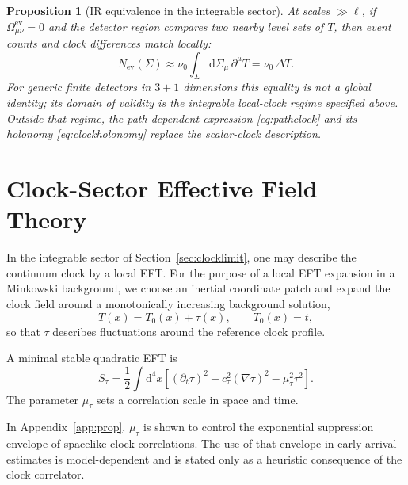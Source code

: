 \documentclass[11pt, a4paper]{article}
\theoremstyle{definition}
\theoremstyle{plain}
\newtheorem{proposition}{Proposition}[section]
\theoremstyle{remark}
\numberwithin{equation}{section}
\newcommand{\dd}{\mathrm{d}}
\newcommand{\Sig}{\Sigma}
\newcommand{\Nev}{N_{\mathrm{ev}}}
\begin{document}
    \begin{proposition}[IR equivalence in the integrable sector]
        At scales $\gg \ell$, if $\Omega^{\mathrm{ev}}_{\mu\nu}=0$ and the detector region compares two nearby level sets of $T$, then event counts and clock differences match locally:
        \begin{equation}
            \Nev(\Sig)\approx \nu_0\int_\Sig \dd\Sigma_\mu\,\partial^\mu T
            =\nu_0\,\Delta T .
        \end{equation}
        For generic finite detectors in $3+1$ dimensions this equality is not a global identity; its domain of validity is the integrable local-clock regime specified above. Outside that regime, the path-dependent expression \eqref{eq:pathclock} and its holonomy \eqref{eq:clockholonomy} replace the scalar-clock description.
    \end{proposition}

    \section{Clock-Sector Effective Field Theory}\label{sec:clockeft}
    
    In the integrable sector of Section~\ref{sec:clocklimit}, one may describe the continuum clock by a local EFT. For the purpose of a local EFT expansion in a Minkowski background, we choose an inertial coordinate patch and expand the clock field around a monotonically increasing background solution,
    \begin{equation}
        T(x)=T_0(x)+\tau(x), \qquad T_0(x)=t,
    \end{equation}
    so that $\tau$ describes fluctuations around the reference clock profile.
    
    A minimal stable quadratic EFT is
    \begin{equation}
        S_\tau = \frac{1}{2}\int \dd^4x
        \left[
            (\partial_t\tau)^2
        - c_\tau^2(\nabla\tau)^2
        - \mu_\tau^2 \tau^2
        \right].
        \label{eq:clockEFT}
    \end{equation}
    The parameter $\mu_\tau$ sets a correlation scale in space and time.
    
    In Appendix~\ref{app:prop}, $\mu_\tau$ is shown to control the exponential suppression envelope of spacelike clock correlations. The use of that envelope in early-arrival estimates is model-dependent and is stated only as a heuristic consequence of the clock correlator.
    
\end{document}
